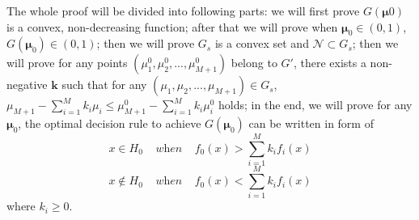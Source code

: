 \documentclass[12pt,journal,a4paper,twoside,onecolumn]{IEEEtran}
\newcommand{\rmnum}[1]{\romannumeral #1}
\begin{document}
\begin{spacing}{2.5}
The whole proof will be divided into following parts: we will first prove $G(\boldsymbol{\mu}0)$ is a convex, non-decreasing function; after that we will prove when $\boldsymbol{\mu}_0 \in (0, 1)$, $G(\boldsymbol{\mu}_0) \in (0, 1)$; then we will prove $G_s$ is a convex set and $\mathcal{N} \subset G_s$; then we will prove for any points $(\mu_1^0, \mu_2^0, ..., \mu_{M+1}^0)$ belong to $G'$, there exists a non-negative $\mathbf{k}$ such that for any $(\mu_1, \mu_2, ..., \mu_{M+1}) \in G_s$, $\mu_{M+1} - \sum_{i=1}^{M}k_i\mu_i \leq \mu_{M+1}^0 - \sum_{i=1}^{M}k_i\mu_i^0$ holds;  in the end, we will prove for any $\boldsymbol{\mu}_0$, the optimal decision rule to achieve $G(\boldsymbol{\mu}_0)$ can be written in form of 
\[
x \in H_0 \;\;\;\;\textit{when}\;\;\;\;f_0(x) > \sum_{i=1}^{M}k_if_i(x)
\]
\[
x \notin H_0 \;\;\;\;\textit{when}\;\;\;\;f_0(x) < \sum_{i=1}^{M}k_if_i(x)
\]
where $k_i \geq 0$.

\end{spacing}
\end{document}
